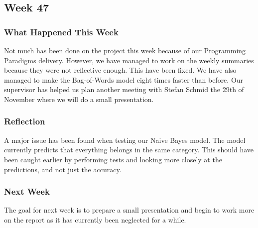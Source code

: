 \subsection{Week 47}
\subsubsection{What Happened This Week}
Not much has been done on the project this week because of our Programming
Paradigms delivery. However, we have managed to work on the weekly summaries
because they were not reflective enough. This have been fixed. We have also
managed to make the Bag-of-Words model eight times faster than before. Our supervisor has
helped us plan another meeting with Stefan Schmid the 29th of
November where we will do a small presentation.

\subsubsection{Reflection}
A major issue has been found when testing our Naive Bayes model. The model
currently predicts that everything belongs in the same category. This should
have been caught earlier by performing tests and looking more closely at the
predictions, and not just the accuracy.

\subsubsection{Next Week}
The goal for next week is to prepare a small presentation and begin to work
more on the report as it has currently been neglected for a while. 


% 
% 
% 
